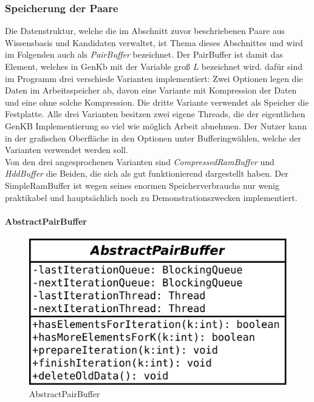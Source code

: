 \documentclass[12pt,a4paper]{article}
\begin{document}
\subsubsection{Speicherung der Paare}
\label{sec:pairbuffer}

Die Datenstruktur, welche die im Abschnitt zuvor beschriebenen Paare aus Wissensbasis und Kandidaten verwaltet, ist Thema dieses Abschnittes und wird im Folgenden auch als  \textit{PairBuffer} bezeichnet. Der PairBuffer ist damit das Element, welches in GenKb mit der Variable groß $L$ bezeichnet wird. dafür sind im Programm drei verschiede Varianten implementiert: Zwei Optionen legen die Daten im Arbeitsspeicher ab, davon eine Variante mit Kompression der Daten und eine ohne solche Kompression. Die dritte Variante verwendet als Speicher die Festplatte. Alle drei Varianten besitzen zwei eigene Threads, die der eigentlichen GenKB Implementierung so viel wie möglich Arbeit abnehmen. Der Nutzer kann in der grafischen Oberfläche in den Optionen unter \glqq Buffering\grqq \space wählen, welche der Varianten verwendet werden soll. \\
Von den drei angesprochenen Varianten  sind \textit{CompressedRamBuffer} und \textit{HddBuffer} die Beiden, die sich als gut funktionierend dargestellt haben. Der SimpleRamBuffer ist wegen seines enormen Speicherverbrauchs nur wenig praktikabel und hauptsächlich noch zu Demonstrationszwecken implementiert.

\paragraph{AbstractPairBuffer}
\label{sec:abstractbuffer}

\begin{figure}
\includegraphics[width=0.45\linewidth]{bilder/AbstractPairBuffer.png}
\caption{AbstractPairBuffer}
\label{pic:abstractpairbuffer}
\end{figure}
\end{document}
